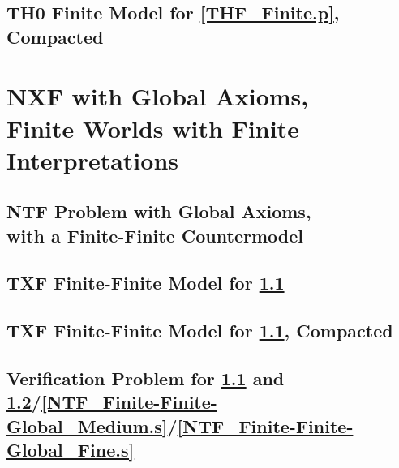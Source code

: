 \documentclass{easychair}
\begin{document}
\newpage
\subsection{TH0 Finite Model for \ref{THF_Finite.p}, Compacted}
\label{THF_Finite_Compact.s}
\begin{small}

\end{small}

\newpage
\section{NXF with Global Axioms, \\
         Finite Worlds with Finite Interpretations}
\label{NXFGlobal}

\subsection{NTF Problem with Global Axioms, \\ with a Finite-Finite Countermodel}
\label{NTF_Finite-Finite-Global.p}
\begin{small}

\end{small}

\newpage
\subsection{TXF Finite-Finite Model for \ref{NTF_Finite-Finite-Global.p}}
\label{NTF_Finite-Finite-Global.s}
\begin{small}

\end{small}

\newpage
\subsection{TXF Finite-Finite Model for \ref{NTF_Finite-Finite-Global.p}, Compacted}
\label{NTF_Finite-Finite-Global_Compact.s}
\begin{small}

\end{small}

\newpage
\subsection{Verification Problem for \ref{NTF_Finite-Finite-Global.p} and 
\ref{NTF_Finite-Finite-Global.s}/\ref{NTF_Finite-Finite-Global_Medium.s}/\ref{NTF_Finite-Finite-Global_Fine.s}}
\label{NTF_Finite-Finite-Global.s.p}
\begin{small}

\end{small}
\end{document}
